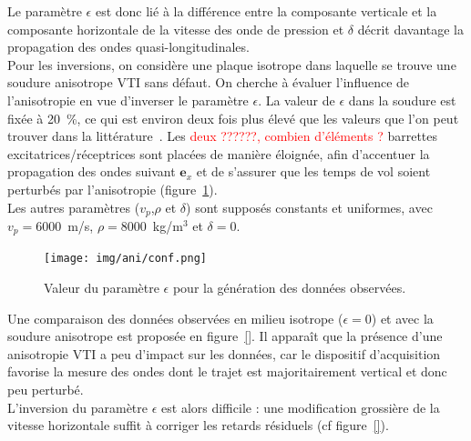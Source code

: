 Le paramètre $\epsilon$ est donc lié à la différence entre la composante verticale et la composante horizontale de la vitesse des onde de pression et $\delta$ décrit davantage la propagation des ondes quasi-longitudinales.\\






Pour les inversions, on considère une plaque isotrope dans laquelle se trouve une soudure anisotrope VTI sans défaut. On cherche à évaluer l'influence de l'anisotropie en vue d'inverser le paramètre $\epsilon$. La valeur de $\epsilon$ dans la soudure est fixée à 20~\%, ce qui est environ deux fois plus élevé que les valeurs que l'on peut trouver dans la littérature~\citep{chassignole}. Les \textcolor{red}{deux ??????, combien d'éléments ?} barrettes excitatrices/réceptrices sont placées de manière éloignée, afin d'accentuer la propagation des ondes suivant $\bm{e}_{x}$ et de s'assurer que les temps de vol soient perturbés par l'anisotropie (figure~\ref{configuration_vti}).\\
Les autres paramètres ($v_{p}$,$\rho$ et $\delta$) sont supposés constants et uniformes, avec $v_{p}=6000$~m/s, $\rho=8000$~kg/m$^3$ et $\delta=0$.\\

\begin{figure}
	\centering
	\texttt{[image: img/ani/conf.png]}
	\caption{Valeur du paramètre $\epsilon$ pour la génération des données observées. \label{configuration_vti} }
\end{figure}

Une comparaison des données observées en milieu isotrope ($\epsilon = 0$) et avec la soudure anisotrope est proposée en figure~\ref{}. Il apparaît que la présence d'une anisotropie VTI a peu d'impact sur les données, car le dispositif d'acquisition favorise la mesure des ondes dont le trajet est majoritairement vertical et donc peu perturbé.\\
 L'inversion du paramètre $\epsilon$ est alors difficile : une modification grossière de la vitesse horizontale suffit à corriger les retards résiduels (cf figure~\ref{}).
 
